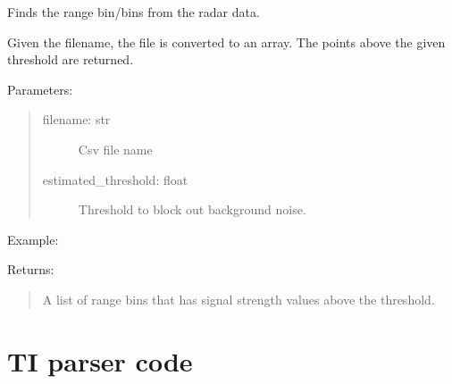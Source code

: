 \documentclass[letterpaper,10pt,english]{sphinxmanual}
\begin{document}
\begin{fulllineitems}
\label{\detokenize{X4 radar:X4_threshold.range_finder}}
Finds the range bin/bins from the radar data.

Given the filename, the file is converted to an array. The points above the given threshold are returned.

Parameters:
\begin{quote}
\begin{description}
\item[{filename: str}] \leavevmode
Csv file name

\item[{estimated\_threshold: float}] \leavevmode
Threshold to block out background noise.

\end{description}
\end{quote}

Example:

\begin{sphinxVerbatim}[commandchars=\\\{\}]
\PYG{p}{[}\PYG{p}{]}
\end{sphinxVerbatim}

Returns:
\begin{quote}

A list of range bins that has signal strength values above the threshold.
\end{quote}

\end{fulllineitems}



\section{TI parser code}
\label{\detokenize{TI radar:module-TI_parser}}\label{\detokenize{TI radar:ti-parser-code}}\label{\detokenize{TI radar::doc}}
\end{document}
